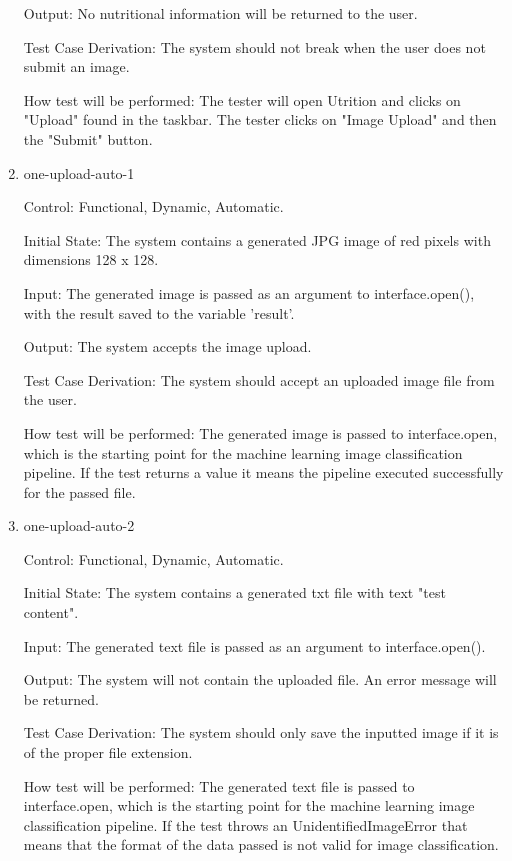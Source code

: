 \documentclass[12pt, titlepage]{article}
\begin{document}
\begin{enumerate}
		Output: No nutritional information will be returned to the user.
		
		Test Case Derivation: The system should not break when the user does not submit an image.
		
		How test will be performed: The tester will open Utrition and clicks on "Upload" found in the taskbar. The tester clicks on "Image Upload" and then the "Submit" button.
		
		\item{one-upload-auto-1\\}
		
		Control: Functional, Dynamic, Automatic.
		
		Initial State: The system contains a generated JPG image of red pixels with dimensions 128 x 128.
		
        Input: The generated image is passed as an argument to interface.open(), with the result saved to the variable 'result'.

		Output: The system accepts the image upload.
		
		Test Case Derivation: The system should accept an uploaded image file from the user.
		
		How test will be performed: The generated image is passed to interface.open, which is the starting point for the machine learning image classification pipeline. If the test returns a value it means the pipeline executed successfully for the passed file.
		
		\item{one-upload-auto-2\\}
		
		Control: Functional, Dynamic, Automatic.
		
		Initial State: The system contains a generated txt file with text "test content".
		
		Input: The generated text file is passed as an argument to interface.open().
		
		Output: The system will not contain the uploaded file. An error message 
		will be returned.
		
		Test Case Derivation: The system should only save the inputted image if 
		it is of the proper file extension.
		
		How test will be performed: The generated text file is passed to interface.open, which is the starting point for the machine learning image classification pipeline. If the test throws an UnidentifiedImageError that means that the format of the data passed is not valid for image classification.

	\end{enumerate}
	
\end{document}
